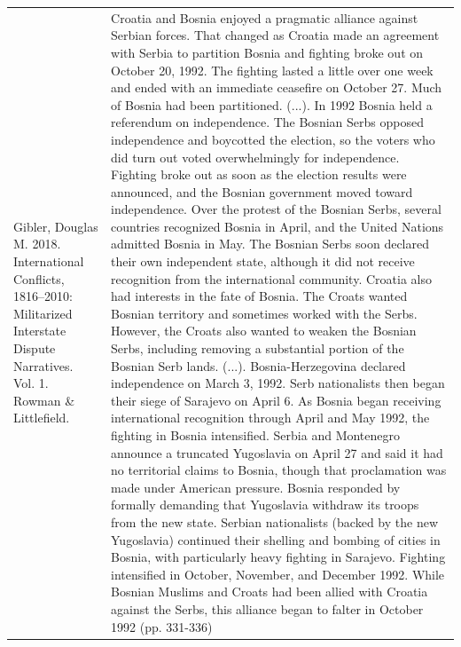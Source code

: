 {\begin{longtable}{p{}p{}}
Gibler, Douglas M. 2018. International Conflicts, 1816–2010: Militarized Interstate Dispute Narratives. Vol. 1. Rowman \& Littlefield. & Croatia and Bosnia enjoyed a pragmatic alliance against Serbian forces. That changed as Croatia made an agreement with Serbia to partition Bosnia and fighting broke out on October 20, 1992. The fighting lasted a little over one week and ended with an immediate ceasefire on October 27. Much of Bosnia had been partitioned. (...).
In 1992 Bosnia held a referendum on independence. The Bosnian Serbs opposed independence and boycotted the election, so the voters who did turn out voted overwhelmingly for independence. Fighting broke out as soon as the election results were announced, and the Bosnian government moved toward independence. Over the protest of the Bosnian Serbs, several countries recognized Bosnia in April, and the United Nations admitted Bosnia in May. The Bosnian Serbs soon declared their own independent state, although it did not receive recognition from the international community. Croatia also had interests in the fate of Bosnia. The Croats wanted Bosnian territory and sometimes worked with the Serbs. However, the Croats also wanted to weaken the Bosnian Serbs, including removing a substantial portion of the Bosnian Serb lands. (...).
Bosnia-Herzegovina declared independence on March 3, 1992. Serb nationalists then began their siege of Sarajevo on April 6. As Bosnia began receiving international recognition through April and May 1992, the fighting in Bosnia intensified. Serbia and Montenegro announce a truncated Yugoslavia on April 27 and said it had no territorial claims to Bosnia, though that proclamation was made under American pressure. Bosnia responded by formally demanding that Yugoslavia withdraw its troops from the new state. Serbian nationalists (backed by the new Yugoslavia) continued their shelling and bombing of cities in Bosnia, with particularly heavy fighting in Sarajevo. Fighting intensified in October, November, and December 1992. While Bosnian Muslims and Croats had been allied with Croatia against the Serbs, this alliance began to falter in October 1992 (pp. 331-336)
\\

\end{longtable}}

